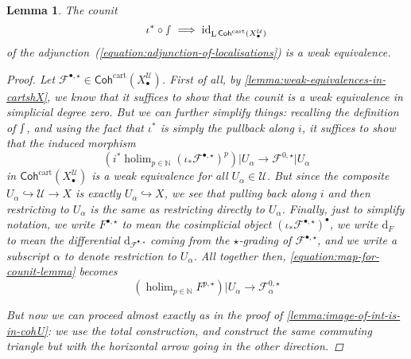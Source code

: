 \documentclass[11pt,fleqn]{article}
\theoremstyle{plain}
\newtheorem{lemma}[theorem]{Lemma}
\theoremstyle{definition}
\theoremstyle{remark}
\numberwithin{equation}{theorem}
\newcommand{\cover}{\mathcal{U}}
\newcommand{\anotherbullet}{\star}
\newcommand{\restricted}{\mathbin{\big\vert}}
\newcommand{\id}{\mathrm{id}}
\newcommand{\cartcohX}{\mathsf{Coh}^\mathrm{cart}(X_\bullet^\cover)}
\renewcommand{\d}{\mathrm{d}}
\DeclareMathOperator{\LL}{L}
\DeclareMathOperator{\holim}{holim}
\begin{document}
        \begin{lemma}\label{lemma:counit-is-iso}
            The counit
            \[
                \iota^*\circ\smallint\implies\id_{\LL{\cartcohX}}
            \]
            of the adjunction~(\ref{equation:adjunction-of-localisations}) is a weak equivalence.
            \begin{proof}
                Let $\mathcal{F}^{\bullet,\anotherbullet}\in\cartcohX$.
                First of all, by \cref{lemma:weak-equivalences-in-cartshX}, we know that it suffices to show that the counit is a weak equivalence in simplicial degree zero.
                But we can further simplify things: recalling the definition of $\smallint$, and using the fact that $\iota^*$ is simply the pullback along $i$, it suffices to show that the induced morphism
                \begin{equation}
                \label{equation:map-for-counit-lemma}
                    \left(
                        i^* \holim_{p\in\mathbb{N}}(\iota_*\mathcal{F}^{\bullet,\anotherbullet})^p
                    \right) \restricted U_\alpha
                    \longrightarrow
                    \mathcal{F}^{0,\anotherbullet} \restricted U_\alpha
                \end{equation}
                in $\cartcohX$ is a weak equivalence for all $U_\alpha\in\cover$.
                But since the composite $U_\alpha\hookrightarrow\cover\to X$ is exactly $U_\alpha\hookrightarrow X$, we see that pulling back along $i$ and then restricting to $U_\alpha$ is the same as restricting directly to $U_\alpha$.
                Finally, just to simplify notation, we write $F^{\bullet,\anotherbullet}$ to mean the cosimplicial object $(\iota_*\mathcal{F}^{\bullet,\anotherbullet})^\bullet$, we write $\d_F$ to mean the differential $\d_{\mathcal{F}^{\bullet,\anotherbullet}}$ coming from the $\anotherbullet$-grading of $\mathcal{F}^{\bullet,\anotherbullet}$, and we write a subscript $\alpha$ to denote restriction to $U_\alpha$.
                All together then, \cref{equation:map-for-counit-lemma} becomes
                \begin{equation}
                \label{equation:simplified-map-for-counit-lemma}
                    \left(
                        \holim_{p\in\mathbb{N}}F^{p,\anotherbullet}
                    \right) \restricted U_\alpha
                    \longrightarrow
                    \mathcal{F}_\alpha^{0,\anotherbullet}
                \end{equation}

                But now we can proceed almost exactly as in the proof of \cref{lemma:image-of-int-is-in-cohU}: we use the total construction, and construct the same commuting triangle but with the horizontal arrow going in the other direction.
            \end{proof}
        \end{lemma}
\end{document}
